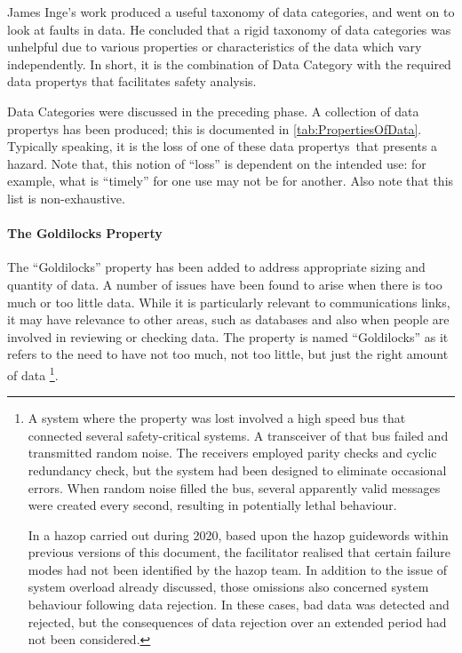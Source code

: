 James Inge's work \cite{citation:inge2008improving} produced a useful taxonomy of data categories, and went on to look at faults in data. He concluded that a rigid taxonomy of data categories was unhelpful due to various properties or characteristics of the data which vary independently. In short, it is the combination of Data Category with the required \glspl{data property} that facilitates safety analysis.

Data Categories were discussed in the preceding phase. A collection of \glspl{data property} has been produced; this is documented in \autoref{tab:PropertiesOfData}. Typically speaking, it is the loss of one of these \cbstart\glspl{data property}\cbend\ that presents a \gls{hazard}. Note that, this notion of ``loss'' is dependent on the intended use: for example, what is ``timely'' for one use may not be for another. Also note that this list is non-exhaustive.

\paragraph{The Goldilocks Property}\label{bkm:guidance:goldilocks}
The ``Goldilocks'' property has been added to address appropriate sizing and quantity of data. A number of issues have been found to arise when there is too much or too little data. While it is particularly relevant to communications links, it may have relevance to other areas, such as \glspl{database} and also when people are involved in reviewing or checking data. The property is named ``Goldilocks'' as it refers to the need to have not too much, not too little, but just the right amount of data%
%
\footnote{A system where the property was lost involved a high speed bus that connected several safety-critical systems. A transceiver of that bus failed and transmitted random noise. The receivers employed parity checks and cyclic redundancy check, but the system had been designed to eliminate occasional \cbstart\glspl{error}\cbend. When random noise filled the bus, several apparently valid messages were created every second, resulting in potentially lethal behaviour.

In a \gls{hazop} carried out during 2020, based upon the \gls{hazop} guidewords within previous versions of this document, the facilitator realised that certain failure modes had not been identified by the \gls{hazop} team. In addition to the issue of system overload already discussed, those omissions also concerned system behaviour following data rejection. In these cases, bad data was detected and rejected, but the consequences of data rejection over an extended period had not been considered.}.

